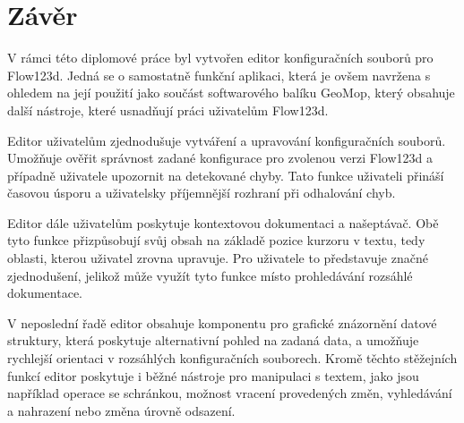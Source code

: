 \documentclass[FM,bw,DP]{tulthesis}
\begin{document}
%
%
%
%
%
%
%
%
%
%
%
%
%
%


\chapter*{Závěr}
V rámci této diplomové práce byl vytvořen editor konfiguračních souborů pro Flow123d. Jedná se o samostatně funkční aplikaci, která je ovšem navržena s ohledem na její použití jako součást softwarového balíku GeoMop, který obsahuje další nástroje, které usnadňují práci uživatelům Flow123d.

Editor uživatelům zjednodušuje vytváření a upravování konfiguračních souborů. Umožňuje ověřit správnost zadané konfigurace pro zvolenou verzi Flow123d a případně uživatele upozornit na detekované chyby. Tato funkce uživateli přináší časovou úsporu a uživatelsky příjemnější rozhraní při odhalování chyb.

Editor dále uživatelům poskytuje kontextovou dokumentaci a našeptávač. Obě tyto funkce přizpůsobují svůj obsah na základě pozice kurzoru v textu, tedy oblasti, kterou uživatel zrovna upravuje. Pro uživatele to představuje značné zjednodušení, jelikož může využít tyto funkce místo prohledávání rozsáhlé dokumentace.

V neposlední řadě editor obsahuje komponentu pro grafické znázornění datové struktury, která poskytuje alternativní pohled na zadaná data, a umožňuje rychlejší orientaci v rozsáhlých konfiguračních souborech. Kromě těchto stěžejních funkcí editor poskytuje i běžné nástroje pro manipulaci s textem, jako jsou například operace se schránkou, možnost vracení provedených změn, vyhledávání a nahrazení nebo změna úrovně odsazení.
\end{document}
